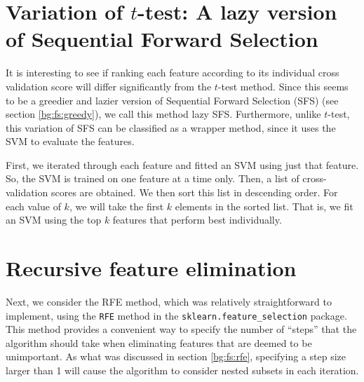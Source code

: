 \documentclass[12pt, twoside, a4paper]{report}
\begin{document}



\section{Variation of $t$-test: A lazy version of Sequential Forward Selection} \label{body:sfs:lazy}

It is interesting to see if ranking each feature according to its individual cross validation score will differ significantly from the $t$-test method. Since this seems to be a greedier and lazier version of Sequential Forward Selection (SFS) (see section \ref{bg:fs:greedy}), we call this method lazy SFS. Furthermore, unlike $t$-test, this variation of SFS can be classified as a wrapper method, since it uses the SVM to evaluate the features.

First, we iterated through each feature and fitted an SVM using just that feature. So, the SVM is trained on one feature at a time only. Then, a list of cross-validation scores are obtained. We then sort this list in descending order. For each value of $k$, we will take the first $k$ elements in the sorted list. That is, we fit an SVM using the top $k$ features that perform best individually.

\section{Recursive feature elimination} \label{body:rfe}

Next, we consider the RFE method, which was relatively straightforward to implement, using the \texttt{RFE} method in the \texttt{sklearn.feature\_selection} package. This method provides a convenient way to specify the number of ``steps'' that the algorithm should take when eliminating features that are deemed to be unimportant. As what was discussed in section \ref{bg:fs:rfe}, specifying a step size larger than 1 will cause the algorithm to consider nested subsets in each iteration.
\end{document}
